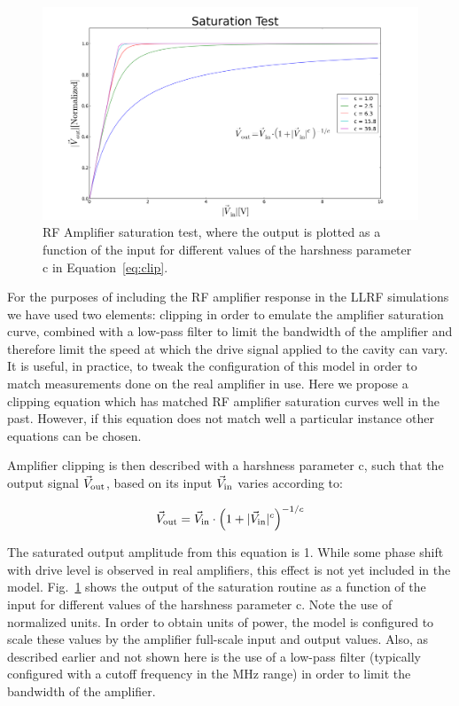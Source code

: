 \documentclass[a4paper,12pt]{article}
\begin{document}
\begin{figure}
\centering
\includegraphics[scale=0.35]{../figures/saturation_test.png}
\caption{RF Amplifier saturation test, where the output is plotted as a function of the input for different values of the harshness parameter c in Equation~\ref{eq:clip}.}
\label{fig:saturation_test}
\end{figure}

For the purposes of including the RF amplifier response in the LLRF simulations we have used two elements: clipping in order to emulate the amplifier saturation curve, combined with a low-pass filter to limit the bandwidth of the amplifier and therefore limit the speed at which the drive signal applied to the cavity can vary. It is useful, in practice, to tweak the configuration of this model in order to match measurements done on the real amplifier in use. Here we propose a clipping equation which has matched RF amplifier saturation curves well in the past. However, if this equation does not match well a particular instance other equations can be chosen.

Amplifier clipping is then described with a harshness parameter c, such that the output signal $\vec V_{\rm out}$, based on its input $\vec V_{\rm in}$ varies according to:

\begin{equation}
  \vec V_{\rm out} = \vec V_{\rm in} \cdot \left(1 + |\vec V_{\rm in}|^c\right)^{-1/c}
  \label{eq:clip}
\end{equation}

The saturated output amplitude from this equation is 1. While some phase shift with drive level is observed in real amplifiers, this effect is not yet included in the model. Fig.~\ref{fig:saturation_test} shows the output of the saturation routine as a function of the input for different values of the harshness parameter c. Note the use of normalized units. In order to obtain units of power, the model is configured to scale these values by the amplifier full-scale input and output values. Also, as described earlier and not shown here is the use of a low-pass filter (typically configured with a cutoff frequency in the MHz range) in order to limit the bandwidth of the amplifier.
\end{document}

